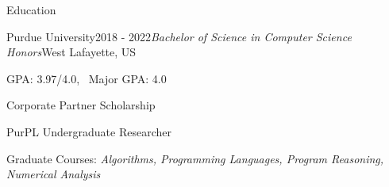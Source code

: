 \documentclass{resume} %
\begin{document}
 


\begin{rSection}{Education}

\begin{rSubsection}{Purdue University}{2018 - 2022}{\textit{Bachelor of Science in Computer Science Honors}}{West Lafayette, US}
\item GPA: 3.97/4.0, \ Major GPA: 4.0
\item Corporate Partner Scholarship
\item PurPL Undergraduate Researcher
\item Graduate Courses: \it Algorithms, Programming Languages,
Program Reasoning, Numerical Analysis
\end{rSubsection}

\end{rSection}

\end{document}
